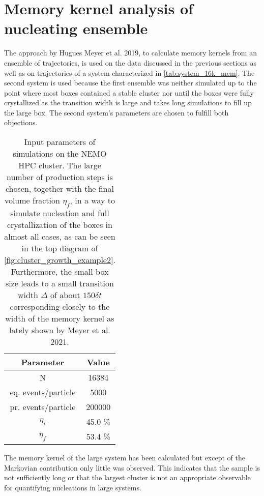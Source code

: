 \section{Memory kernel analysis of nucleating ensemble}
\label{sec:memory_kernels}
The approach by Hugues Meyer et al. 2019\cite{Meyer2019a}, to calculate memory kernels from an ensemble of trajectories, is used on the data discussed in the previous sections as well as on trajectories of a system characterized in \autoref{tab:system_16k_mem}. The second system is used because the first ensemble was neither simulated up to the point where most boxes contained a stable cluster nor until the boxes were fully crystallized as the transition width is large and takes long simulations to fill up the large box. The second system's parameters are chosen to fulfill both objections.\\
\begin{table}[ht]
\centering
\begin{tabular}{c|c}
Parameter & Value \\ \hline
N & 16384 \\
eq. events/particle & 5000 \\
pr. events/particle & 200000 \\
$\eta_i$ & 45.0 \% \\
$\eta_f$ & 53.4 \% \\
\end{tabular}
\caption[Simulation parameters of data production system with 16384 particles]{Input parameters of simulations on the NEMO HPC cluster. The large number of production steps is chosen, together with the final volume fraction $\eta_f$, in a way to simulate nucleation and full crystallization of the boxes in almost all cases, as can be seen in the top diagram of \autoref{fig:cluster_growth_example2}. Furthermore, the small box size leads to a small transition width $\Delta$ of about $150 \delta t$ corresponding closely to the width of the memory kernel as lately shown by Meyer et al. 2021\cite{Meyer2021}.} 
\label{tab:system_16k_mem}
\end{table}

The memory kernel of the large system has been calculated but except of the Markovian contribution only little was observed. This indicates that the sample is not sufficiently long or that the largest cluster is not an appropriate observable for quantifying nucleations in large systems.\\

